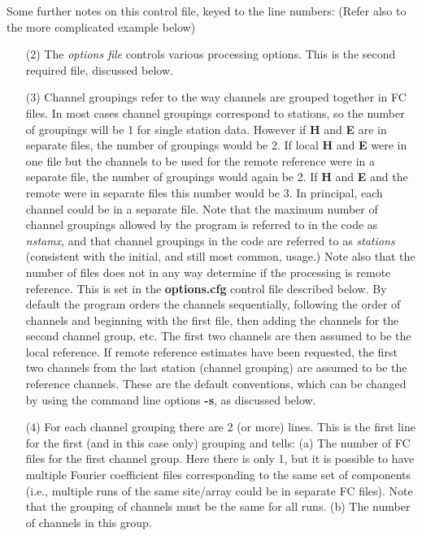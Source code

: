 Some further notes on this control file, keyed to the line numbers:
(Refer also to the more complicated example below)
\begin{itemize}

\item[(2)]
The {\it options file} controls various processing options.  This
is the second required file, discussed below.

\item[(3)]
Channel groupings refer to the way channels are grouped
together in FC files.
In most cases channel groupings correspond to
stations, so the number of groupings will be
1 for single station data.  However if {\bf H} and {\bf E}
are in separate files, the number of groupings would be 2.
If local {\bf H} and {\bf E} were in one file but
the channels to be used for the remote reference were in a separate file,
the number of groupings would again be 2.
If {\bf H} and {\bf E} and the remote were
in separate files this number would be 3.  In principal,
each channel could be in a separate file.
Note that the maximum number of channel groupings
allowed by the program is referred to in the code as
{\it nstamx}, and that channel groupings in the code
are referred to as {\it stations} (consistent with the initial,
and still most common, usage.)
Note also that the number of files does
not in any way determine if the processing is remote reference.
This is set in the {\bf options.cfg} control file described below.
By default the program orders the channels sequentially, following
the order of channels and beginning with the first file, then adding the
channels for the second channel group, etc.
The first two channels are then assumed
to be the local reference.  If remote reference estimates
have been requested, the first two channels from the
last station (channel grouping) are assumed to be the reference channels.
These are the default conventions, which can be changed by using 
the command line options {\bf -s}, as discussed below. 

\item[(4)] For each channel grouping there
are 2 (or more) lines.
This is the first line for the first (and in this case only)
grouping and tells: (a) The number of FC files for the first channel group.
Here there is only 1, but it is possible to have multiple Fourier
coefficient files corresponding to the same set of components
(i.e., multiple runs of the same site/array could be in separate FC files).
Note that the grouping of channels must be the same for all runs.
(b) The number of channels in this group.


\end{itemize}

